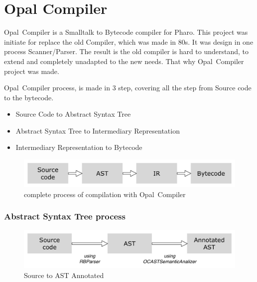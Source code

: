 \documentclass[a4paper,10pt,twoside]{book}
\begin{document}
	\renewcommand{\nnbb}[2]{} %
	\sloppy
\fi


\newcommand{\opal}[0]{Opal~Compiler } %
\chapter{Opal Compiler} 


\opal is a Smalltalk to Bytecode compiler for Pharo. This project was initiate for replace the old Compiler, which was made in 80s. It was design in one process Scanner/Parser. The result is the old compiler is hard to understand, to extend and completely unadapted to the new needs. That why \opal project was made.

\opal process, is made in 3 step, covering all the step from Source code to the bytecode.
\begin{itemize}
\item Source Code to Abstract Syntax Tree
\item Abstract Syntax Tree to Intermediary Representation
\item Intermediary Representation to Bytecode
\end{itemize}

\begin{figure}[ht]\centering
	\includegraphics[width=\linewidth]{fullProcess}
	\caption{complete process of compilation with \opal {}}
\end{figure}

\subsection{Abstract Syntax Tree process}

\begin{figure}[ht]\centering
	\includegraphics[width=\linewidth]{SourceToAnnotatedAST}
	\caption{Source to AST Annotated }
\end{figure}
\end{document}
